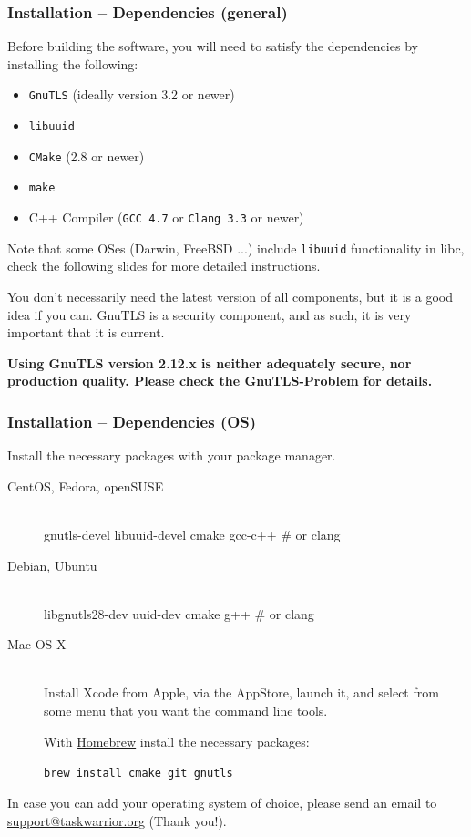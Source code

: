\documentclass[t,handout]{beamer}
\begin{document}
\begin{frame}[fragile]\frametitle{Installation -- Dependencies (general)}
    Before building the software, you will need to satisfy the dependencies by installing the following:

    \begin{itemize}
        \item \verb+GnuTLS+ (ideally version 3.2 or newer)
        \item \verb+libuuid+
        \item \verb+CMake+ (2.8 or newer)
        \item \verb+make+
        \item C++ Compiler (\verb+GCC 4.7+ or \verb+Clang 3.3+ or newer)
    \end{itemize}

    Note that some OSes (Darwin, FreeBSD ...) include \verb+libuuid+ functionality in libc, check the following slides for more detailed instructions.

    You don't necessarily need the latest version of all components, but it is a good idea if you can.  GnuTLS is a security component, and as such, it is very important that it is current.

    \textbf{Using GnuTLS version 2.12.x is neither adequately secure, nor production quality. Please check the GnuTLS-Problem for details.}
\end{frame}

\begin{frame}[fragile]\frametitle{Installation -- Dependencies (OS)}
    Install the necessary packages with your package manager.

    \begin{description}
        \item[CentOS, Fedora, openSUSE] \hfill \\
            gnutls-devel libuuid-devel cmake gcc-c++ \# or clang
        \item[Debian, Ubuntu] \hfill \\
            libgnutls28-dev uuid-dev cmake g++ \# or clang
        \item[Mac OS X] \hfill \\
            Install Xcode from Apple, via the AppStore, launch it, and select from some menu that you want the command line tools.

            With \href{http://brew.sh/}{Homebrew} install the necessary packages:

            \verb=brew install cmake git gnutls=
    \end{description}

    In case you can add your operating system of choice, please send an email to \href{mailto:support@taskwarrior.org}{support@taskwarrior.org} (Thank you!).
\end{frame}
\end{document}
